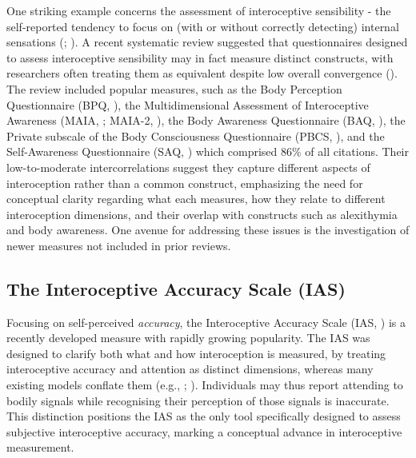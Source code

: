 \documentclass[
  jou,
  floatsintext,
  longtable,
  nolmodern,
  notxfonts,
  notimes,
  colorlinks=true,linkcolor=blue,citecolor=blue,urlcolor=blue]{apa7}
\begin{document}
One striking example concerns the assessment of interoceptive
sensibility - the self-reported tendency to focus on (with or without
correctly detecting) internal sensations
(;
). A recent systematic review suggested that questionnaires
designed to assess interoceptive sensibility may in fact measure
distinct constructs, with researchers often treating them as equivalent
despite low overall convergence
(). The review
included popular measures, such as the Body Perception Questionnaire
(BPQ, ), the Multidimensional
Assessment of Interoceptive Awareness (MAIA,
; MAIA-2,
), the
Body Awareness Questionnaire (BAQ,
), the Private
subscale of the Body Consciousness Questionnaire (PBCS,
), and the
Self-Awareness Questionnaire (SAQ,
) which comprised
86\% of all citations. Their low-to-moderate intercorrelations suggest
they capture different aspects of interoception rather than a common
construct, emphasizing the need for conceptual clarity regarding what
each measures, how they relate to different interoception dimensions,
and their overlap with constructs such as alexithymia and body
awareness. One avenue for addressing these issues is the investigation
of newer measures not included in prior reviews.

\subsection{The Interoceptive Accuracy Scale
(IAS)}\label{the-interoceptive-accuracy-scale-ias}

Focusing on self-perceived \emph{accuracy}, the Interoceptive Accuracy
Scale (IAS, ) is a
recently developed measure with rapidly growing popularity. The IAS was
designed to clarify both what and how interoception is measured, by
treating interoceptive accuracy and attention as distinct dimensions,
whereas many existing models conflate them (e.g.,
;
). Individuals may thus report attending to bodily signals
while recognising their perception of those signals is inaccurate. This
distinction positions the IAS as the only tool specifically designed to
assess subjective interoceptive accuracy, marking a conceptual advance
in interoceptive measurement.
\end{document}
